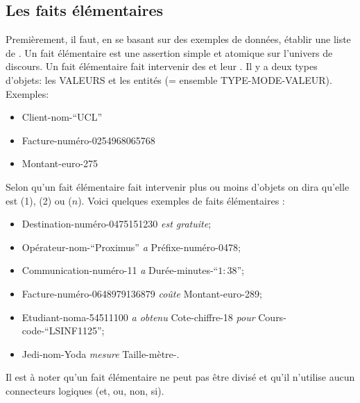 \subsection{Les faits élémentaires}
Premièrement,
il faut, en se basant sur des exemples de données,
établir une liste de .
Un fait élémentaire est une assertion simple et atomique
sur l'univers de discours.
Un fait élémentaire fait intervenir des  et leur .
Il y a deux types d'objets:
les VALEURS et les entités (= ensemble TYPE-MODE-VALEUR).
Exemples:
\begin{itemize}
  \item Client-nom-``UCL''
  \item Facture-numéro-0254968065768
  \item Montant-euro-275
\end{itemize}

Selon qu'un fait élémentaire fait intervenir plus ou moins d'objets
on dira qu'elle est  (1),
 (2) ou  ($n$).
Voici quelques exemples de faits élémentaires :
\begin{itemize}
  \item Destination-numéro-0475151230 \emph{est gratuite};
  \item Opérateur-nom-``Proximus'' \emph{a} Préfixe-numéro-0478;
  \item Communication-numéro-11 \emph{a} Durée-minutes-``$1:38$'';
  \item Facture-numéro-0648979136879 \emph{coûte} Montant-euro-289;
  \item Etudiant-noma-54511100 \emph{a obtenu} Cote-chiffre-18
    \emph{pour} Cours-code-``LSINF1125'';
  \item Jedi-nom-Yoda \emph{mesure} Taille-mètre-.
\end{itemize}
Il est à noter qu'un fait élémentaire ne peut pas être divisé et
qu'il n'utilise aucun connecteurs logiques (et, ou, non, si).

